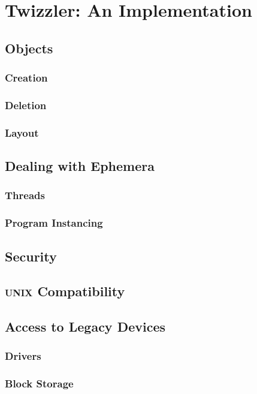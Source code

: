 
\chapter{Twizzler: An Implementation}\label{ch:twizzler}

\section{Objects}

\subsection{Creation}

\subsection{Deletion}

\subsection{Layout}
\section{Dealing with Ephemera}

\subsection{Threads}

\subsection{Program Instancing}

\section{Security}

\section{\textsc{unix} Compatibility}

\section{Access to Legacy Devices}

\subsection{Drivers}

\subsection{Block Storage}